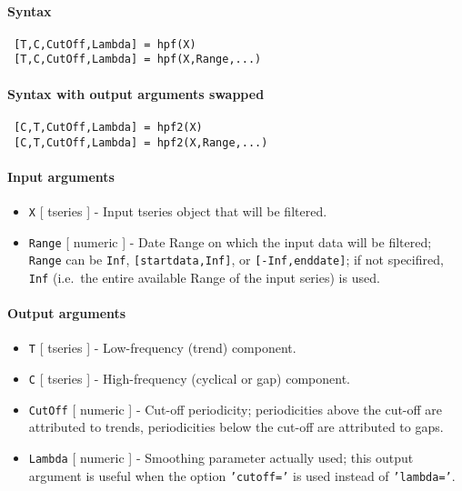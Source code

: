


	\paragraph{Syntax}
 
 \begin{verbatim}
 [T,C,CutOff,Lambda] = hpf(X)
 [T,C,CutOff,Lambda] = hpf(X,Range,...)
 \end{verbatim}
 
 \paragraph{Syntax with output arguments swapped}
 
 \begin{verbatim}
 [C,T,CutOff,Lambda] = hpf2(X)
 [C,T,CutOff,Lambda] = hpf2(X,Range,...)
 \end{verbatim}
 
 \paragraph{Input arguments}
 
 \begin{itemize}
 \item
   \texttt{X} {[} tseries {]} - Input tseries object that will be
   filtered.
 \item
   \texttt{Range} {[} numeric {]} - Date Range on which the input data
   will be filtered; \texttt{Range} can be \texttt{Inf},
   \texttt{{[}startdata,Inf{]}}, or \texttt{{[}-Inf,enddate{]}}; if not
   specifired, \texttt{Inf} (i.e.~the entire available Range of the input
   series) is used.
 \end{itemize}
 
 \paragraph{Output arguments}
 
 \begin{itemize}
 \item
   \texttt{T} {[} tseries {]} - Low-frequency (trend) component.
 \item
   \texttt{C} {[} tseries {]} - High-frequency (cyclical or gap)
   component.
 \item
   \texttt{CutOff} {[} numeric {]} - Cut-off periodicity; periodicities
   above the cut-off are attributed to trends, periodicities below the
   cut-off are attributed to gaps.
 \item
   \texttt{Lambda} {[} numeric {]} - Smoothing parameter actually used;
   this output argument is useful when the option \texttt{'cutoff='} is
   used instead of \texttt{'lambda='}.
 \end{itemize}
 
